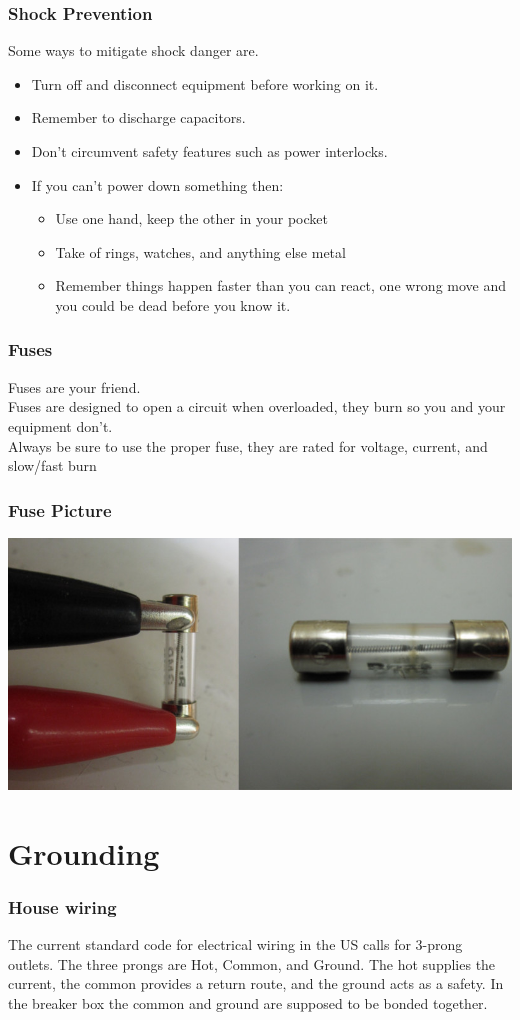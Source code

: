 \documentclass[10pt]{beamer}
\begin{document}
\begin{frame}
\frametitle{Shock Prevention}
Some ways to mitigate shock danger are.\\
\begin{itemize}
\item Turn off and disconnect equipment before working on it.
\item Remember to discharge capacitors.
\item Don't circumvent safety features such as power interlocks.
\item If you can't power down something then:
\begin{itemize}
\item Use one hand, keep the other in your pocket
\item Take of rings, watches, and anything else metal
\item Remember things happen faster than you can react, one wrong move and you could be dead before you know it.
\end{itemize}
\end{itemize}
\end{frame}


\begin{frame}
\frametitle{Fuses}
Fuses are your friend.\\
Fuses are designed to open a circuit when overloaded, they burn so you and your equipment don't.\\
Always be sure to use the proper fuse, they are rated for voltage, current, and slow/fast burn
\end{frame}

\begin{frame}
\frametitle{Fuse Picture}
\includegraphics[width=\textwidth]{fuse.jpg}
\end{frame}

\section{Grounding}
\begin{frame}
\frametitle{House wiring}
The current standard code for electrical wiring in the US calls for 3-prong outlets. The three prongs are Hot, Common, and Ground. The hot supplies the current, the common provides a return route, and the ground acts as a safety. In the breaker box the common and ground are supposed to be bonded together.
\end{frame}
\end{document}
